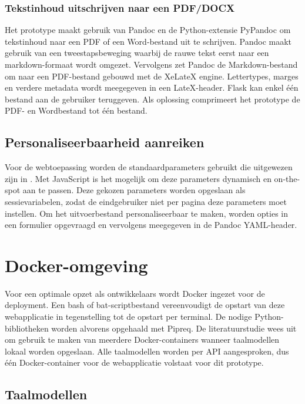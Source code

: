 \subsubsection{Tekstinhoud uitschrijven naar een PDF/DOCX}

Het prototype maakt gebruik van Pandoc en de Python-extensie PyPandoc om tekstinhoud naar een PDF of een Word-bestand uit te schrijven. Pandoc maakt gebruik van een tweestapsbeweging waarbij de rauwe tekst eerst naar een markdown-formaat wordt omgezet. Vervolgens zet Pandoc de Markdown-bestand om naar een PDF-bestand gebouwd met de XeLateX engine. Lettertypes, marges en verdere metadata wordt meegegeven in een LateX-header. Flask kan enkel één bestand aan de gebruiker teruggeven. Als oplossing comprimeert het prototype de PDF- en Wordbestand tot één bestand. 

\subsection{Personaliseerbaarheid aanreiken}

Voor de webtoepassing worden de standaardparameters gebruikt die uitgewezen zijn in \textcite{Rello2013a, Rello2013b}. Met JavaScript is het mogelijk om deze parameters dynamisch en on-the-spot aan te passen. Deze gekozen parameters worden opgeslaan als sessievariabelen, zodat de eindgebruiker niet per pagina deze parameters moet instellen. Om het uitvoerbestand personaliseerbaar te maken, worden opties in een formulier opgevraagd en vervolgens meegegeven in de Pandoc YAML-header.

\section{Docker-omgeving}

Voor een optimale opzet als ontwikkelaars wordt Docker ingezet voor de deployment. Een bash of bat-scriptbestand vereenvoudigt de opstart van deze webapplicatie in tegenstelling tot de opstart per terminal. De nodige Python-bibliotheken worden alvorens opgehaald met Pipreq. De literatuurstudie wees uit om gebruik te maken van meerdere Docker-containers wanneer taalmodellen lokaal worden opgeslaan. Alle taalmodellen worden per API aangesproken, dus één Docker-container voor de webapplicatie volstaat voor dit prototype.

\subsection{Taalmodellen}

